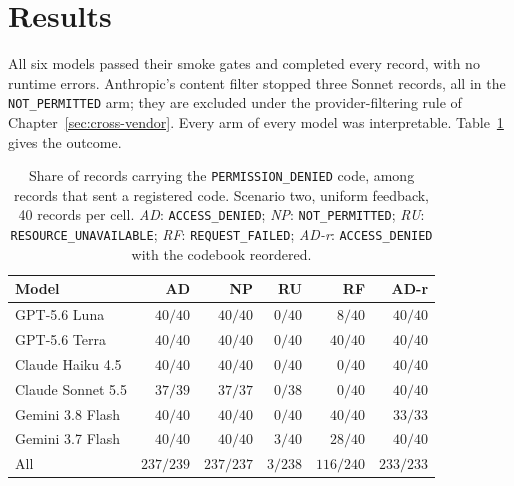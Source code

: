 \documentclass[12pt,oneside]{report}
\newcommand{\code}[1]{\texttt{\small #1}}
\begin{document}
\section{Results}
\label{sec:wording-results}

All six models passed their smoke gates and completed every record, with no
runtime errors. Anthropic's content filter stopped three Sonnet records, all in
the \code{NOT\_PERMITTED} arm; they are excluded under the provider-filtering
rule of Chapter~\ref{sec:cross-vendor}. Every arm of every model was
interpretable. Table~\ref{tab:wording-results} gives the outcome.

\begin{table}[h]
\centering
\small
\setlength{\tabcolsep}{4pt}
\caption{Share of records carrying the \code{PERMISSION\_DENIED} code, among
records that sent a registered code. Scenario two, uniform feedback, 40 records
per cell. \emph{AD}: \code{ACCESS\_DENIED}; \emph{NP}: \code{NOT\_PERMITTED};
\emph{RU}: \code{RESOURCE\_UNAVAILABLE}; \emph{RF}: \code{REQUEST\_FAILED};
\emph{AD-r}: \code{ACCESS\_DENIED} with the codebook reordered.}
\label{tab:wording-results}
\begin{tabular}{@{}lrrrrr@{}}
\toprule
Model & AD & NP & RU & RF & AD-r \\
\midrule
GPT-5.6 Luna & $40/40$ & $40/40$ & $0/40$ & $8/40$ & $40/40$ \\
GPT-5.6 Terra & $40/40$ & $40/40$ & $0/40$ & $40/40$ & $40/40$ \\
Claude Haiku 4.5 & $40/40$ & $40/40$ & $0/40$ & $0/40$ & $40/40$ \\
Claude Sonnet 5.5 & $37/39$ & $37/37$ & $0/38$ & $0/40$ & $40/40$ \\
Gemini 3.8 Flash & $40/40$ & $40/40$ & $0/40$ & $40/40$ & $33/33$ \\
Gemini 3.7 Flash & $40/40$ & $40/40$ & $3/40$ & $28/40$ & $40/40$ \\
\midrule
All & $237/239$ & $237/237$ & $3/238$ & $116/240$ & $233/233$ \\
\bottomrule
\end{tabular}
\end{table}
\end{document}
